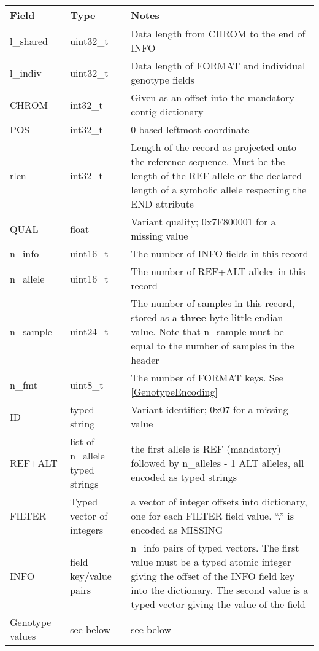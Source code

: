 \documentclass[8pt]{article}
\begin{document}
{\small
\begin{tabular}{|l | l | p{30em} | } \hline
\textbf{Field} &	\textbf{Type} &	\textbf{Notes} \\ \hline
l\_shared & uint32\_t & Data length from CHROM to the end of INFO \\ \hline
l\_indiv  & uint32\_t & Data length of FORMAT and individual genotype fields \\ \hline
CHROM     & int32\_t  & Given as an offset into the mandatory contig dictionary \\ \hline
POS       & int32\_t  & 0-based leftmost coordinate \\ \hline
rlen      & int32\_t  & Length of the record as projected onto the reference sequence.
                        Must be the length of the REF allele or the declared length of a symbolic allele
                        respecting the END attribute \\ \hline
QUAL      & float     & Variant quality; 0x7F800001 for a missing value \\ \hline
n\_info   & uint16\_t & The number of INFO fields in this record \\ \hline
n\_allele & uint16\_t & The number of REF+ALT alleles in this record \\ \hline
n\_sample & uint24\_t & The number of samples in this record, stored as a \textbf{three} byte little-endian value.
                        Note that n\_sample must be equal to the number of samples in the header \\ \hline
n\_fmt    & uint8\_t  & The number of FORMAT keys.  See \ref{GenotypeEncoding} \\ \hline
ID       & typed string & Variant identifier; 0x07 for a missing value \\ \hline
REF+ALT  & list of n\_allele typed strings & the first allele is REF (mandatory) followed by n\_alleles - 1 ALT
                                             alleles, all encoded as typed strings \\ \hline
FILTER   & Typed vector of integers & a vector of integer offsets into dictionary, one for each FILTER field value.
                                      ``.'' is encoded as MISSING \\ \hline
INFO     & field key/value pairs & n\_info pairs of typed vectors.
                                   The first value must be a typed atomic integer giving the offset of the INFO field
                                   key into the dictionary.
                                   The second value is a typed vector giving the value of the field \\ \hline
Genotype values & see below & see below \\ \hline
\end{tabular}}
\end{document}
